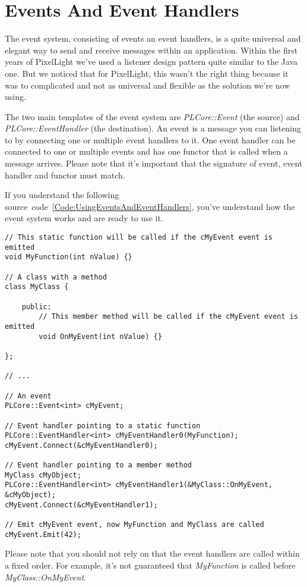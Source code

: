 \section{Events And Event Handlers}
\label{Chapter:EventsAndEventHandlers}
The event system, consisting of events an event handlers, is a quite universal and elegant way to send and receive messages within an application. Within the first years of PixelLight we've used a listener design pattern quite similar to the Java one. But we noticed that for PixelLight, this wasn't the right thing because it was to complicated and not as universal and flexible as the solution we're now using.

The two main templates of the event system are \emph{PLCore::Event} (the source) and \emph{PLCore::EventHandler} (the destination). An event is a message you can listening to by connecting one or multiple event handlers to it. One event handler can be connected to one or multiple events and has one functor that is called when a message arrives. Please note that it's important that the signature of event, event handler and functor must match.

If you understand the following source~code~\ref{Code:UsingEventsAndEventHandlers}, you've understand how the event system works and are ready to use it.
\begin{lstlisting}[label=Code:UsingEventsAndEventHandlers,caption={Using events and event handlers}]
// This static function will be called if the cMyEvent event is emitted
void MyFunction(int nValue) {}

// A class with a method
class MyClass {

	public:
		// This member method will be called if the cMyEvent event is emitted
		void OnMyEvent(int nValue) {}

};

// ...

// An event
PLCore::Event<int> cMyEvent;

// Event handler pointing to a static function
PLCore::EventHandler<int> cMyEventHandler0(MyFunction);
cMyEvent.Connect(&cMyEventHandler0);

// Event handler pointing to a member method
MyClass cMyObject;
PLCore::EventHandler<int> cMyEventHandler1(&MyClass::OnMyEvent, &cMyObject);
cMyEvent.Connect(&cMyEventHandler1);

// Emit cMyEvent event, now MyFunction and MyClass are called
cMyEvent.Emit(42);
\end{lstlisting}
Please note that you should not rely on that the event handlers are called within a fixed order. For example, it's not guaranteed that \emph{MyFunction} is called before \emph{MyClass::OnMyEvent}.
